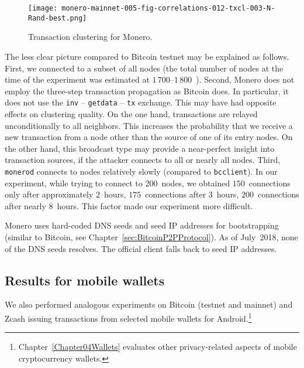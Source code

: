 \begin{figure}[!t]
	\centering
	\texttt{[image: monero-mainnet-005-fig-correlations-012-txcl-003-N-Rand-best.png]}
	\caption{Transaction clustering for Monero.}
	\label{fig:monero}
\end{figure}

The less clear picture compared to Bitcoin testnet may be explained as follows.
First, we connected to a subset of all nodes (the total number of nodes at the time of the experiment was estimated at $1\,700$--$1\,800$~\cite{MoneroHash}).
Second, Monero does not employ the three-step transaction propagation as Bitcoin does.
In particular, it does not use the \texttt{inv} -- \texttt{getdata} -- \texttt{tx} exchange.
This may have had opposite effects on clustering quality.
On the one hand, transactions are relayed unconditionally to all neighbors.
This increases the probability that we receive a new transaction from a node other than the source of one of its entry nodes.
On the other hand, this broadcast type may provide a near-perfect insight into transaction sources, if the attacker connects to all or nearly all nodes.
Third, \texttt{monerod} connects to nodes relatively slowly (compared to \texttt{bcclient}).
In our experiment, while trying to connect to $200$~nodes, we obtained $150$~connections only after approximately $2$~hours, $175$~connections after $3$~hours, $200$~connections after nearly $8$~hours.
This factor made our experiment more difficult.

Monero uses hard-coded DNS seeds and seed IP addresses for bootstrapping (similar to Bitcoin, see Chapter~\ref{sec:BitcoinP2PProtocol}).
As of July~2018, none of the DNS seeds resolves.
The official client falls back to seed IP addresses.


\subsection{Results for mobile wallets}

We also performed analogous experiments on Bitcoin (testnet and mainnet) and Zcash issuing transactions from selected mobile wallets for Android.\footnote{Chapter~\ref{Chapter04Wallets} evaluates other privacy-related aspects of mobile cryptocurrency wallets.}

